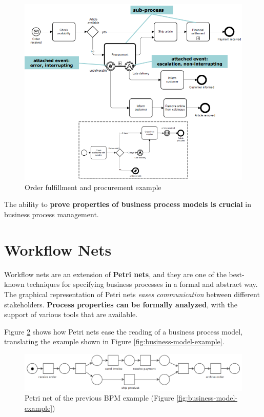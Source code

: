 \begin{figure} [H]
    \centering
    \includegraphics[width=1\textwidth]{images/BusinessProcessModeling/BPMN-order.png}
    \caption{Order fulfillment and procurement example}
    \label{fig:BPMN-order}
\end{figure} 

\noindent The ability to \textbf{prove properties of business process models is crucial} in business process management.

\section{Workflow Nets}

Workflow nets are an extension of \textbf{Petri nets}, and they are one of the best-known techniques for specifying business processes in a formal and abstract way. The graphical representation of Petri nets \textit{eases communication} between different stakeholders. \textbf{Process properties can be formally analyzed}, with the support of various tools that are available.

Figure \ref{fig:petri-nets-example} shows how Petri nets ease the reading of a business process model, translating the example shown in Figure \ref{fig:business-model-example}.

\begin{figure} [H]
    \centering
    \includegraphics[width=1\textwidth]{images/BusinessProcessModeling/petri-nets-example.PNG}
    \caption{Petri net of the previous BPM example (Figure \ref{fig:business-model-example})}
    \label{fig:petri-nets-example}
\end{figure} 


